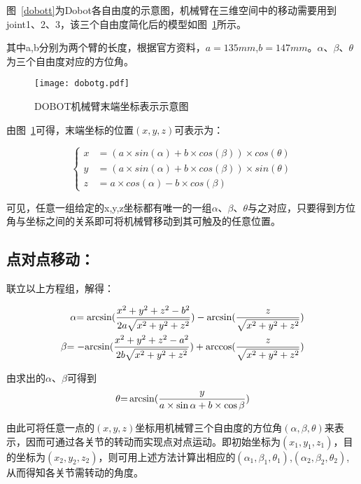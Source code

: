 图~\ref{dobott}为Dobot各自由度的示意图，机械臂在三维空间中的移动需要用到joint1、2、3，该三个自由度简化后的模型如图~\ref{dobotg}所示。

其中a,b分别为两个臂的长度，根据官方资料，$a=135mm$,$b=147mm$。$\alpha$、$\beta$、$\theta$ 为三个自由度对应的方位角。

\begin{figure}[htbp]
\small
\centering
\texttt{[image: dobotg.pdf]}
\caption{DOBOT机械臂末端坐标表示示意图} 
\label{dobotg}
\end{figure}

由图~\ref{dobotg}可得，末端坐标的位置$(x,y,z)$可表示为：

\begin{displaymath}
	\left\{  
\begin{aligned}
x&=(a \times sin(\alpha)+b \times cos(\beta))\times cos(\theta)\\
y&=(a \times sin(\alpha)+b \times cos(\beta)) \times sin(\theta)\\
z&=a \times cos(\alpha)-b \times cos(\beta)
\end{aligned}
	\right.	
\end{displaymath}

可见，任意一组给定的x,y,z坐标都有唯一的一组$\alpha$、$\beta$、$\theta$与之对应，只要得到方位角与坐标之间的关系即可将机械臂移动到其可触及的任意位置。

\subsection{点对点移动：}
联立以上方程组，解得：

\begin{align}
\alpha {\rm{ = arcsin(}}\frac{{{x^2} + {y^2} + {z^2} - {b^2}}}{{2a\sqrt {{x^2} + {y^2} + {z^2}} }}) - {\rm{arcsin(}}\frac{z}{{\sqrt {{x^2} + {y^2} + {z^2}} }})\\
\beta {\rm{ =  - arcsin(}}\frac{{{x^2} + {y^2} + {z^2} - {a^2}}}{{2b\sqrt {{x^2} + {y^2} + {z^2}} }}) + {\rm{arccos(}}\frac{z}{{\sqrt {{x^2} + {y^2} + {z^2}} }})
\end{align}

由求出的$\alpha$、$\beta$可得到
\begin{equation}
\theta {\rm{ = }}\arcsin (\frac{y}{{a \times \sin \alpha  + b \times \cos \beta }})
\end{equation}

由此可将任意一点的$(x,y,z)$坐标用机械臂三个自由度的方位角$(\alpha,\beta,\theta)$来表示，因而可通过各关节的转动而实现点对点运动。即初始坐标为$(x_1,y_1,z_1)$，目的坐标为$(x_2,y_2,z_2)$，则可用上述方法计算出相应的$(\alpha_1,\beta_1,\theta_1)$,$(\alpha_2,\beta_2,\theta_2)$,从而得知各关节需转动的角度。

